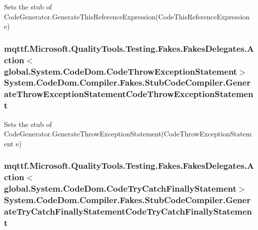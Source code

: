Sets the stub of Code\-Generator.\-Generate\-This\-Reference\-Expression(\-Code\-This\-Reference\-Expression e)

\hypertarget{class_system_1_1_code_dom_1_1_compiler_1_1_fakes_1_1_stub_code_compiler_ace690988ec2ac3eb483c613e4b22f603}{
\subsubsection[{Generate\-Throw\-Exception\-Statement\-Code\-Throw\-Exception\-Statement}]{\setlength{\rightskip}{0pt plus 5cm}mqttf.\-Microsoft.\-Quality\-Tools.\-Testing.\-Fakes.\-Fakes\-Delegates.\-Action$<$global.\-System.\-Code\-Dom.\-Code\-Throw\-Exception\-Statement$>$ System.\-Code\-Dom.\-Compiler.\-Fakes.\-Stub\-Code\-Compiler.\-Generate\-Throw\-Exception\-Statement\-Code\-Throw\-Exception\-Statement}}\label{class_system_1_1_code_dom_1_1_compiler_1_1_fakes_1_1_stub_code_compiler_ace690988ec2ac3eb483c613e4b22f603}


Sets the stub of Code\-Generator.\-Generate\-Throw\-Exception\-Statement(\-Code\-Throw\-Exception\-Statement e)

\hypertarget{class_system_1_1_code_dom_1_1_compiler_1_1_fakes_1_1_stub_code_compiler_a4e248d8362bfdb2888e6a2ae2a4bbf8a}{
\subsubsection[{Generate\-Try\-Catch\-Finally\-Statement\-Code\-Try\-Catch\-Finally\-Statement}]{\setlength{\rightskip}{0pt plus 5cm}mqttf.\-Microsoft.\-Quality\-Tools.\-Testing.\-Fakes.\-Fakes\-Delegates.\-Action$<$global.\-System.\-Code\-Dom.\-Code\-Try\-Catch\-Finally\-Statement$>$ System.\-Code\-Dom.\-Compiler.\-Fakes.\-Stub\-Code\-Compiler.\-Generate\-Try\-Catch\-Finally\-Statement\-Code\-Try\-Catch\-Finally\-Statement}}\label{class_system_1_1_code_dom_1_1_compiler_1_1_fakes_1_1_stub_code_compiler_a4e248d8362bfdb2888e6a2ae2a4bbf8a}


